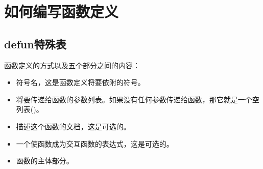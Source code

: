 \chapter{如何编写函数定义}
\section{defun特殊表}
函数定义的方式以及五个部分之间的内容：
\begin{itemize}
\item 符号名，这是函数定义将要依附的符号。
\item 将要传递给函数的参数列表。如果没有任何参数传递给函数，那它就是一个空列表()。
\item 描述这个函数的文档，这是可选的。
\item 一个使函数成为交互函数的表达式，这是可选的。
\item 函数的主体部分。
\end{itemize}
